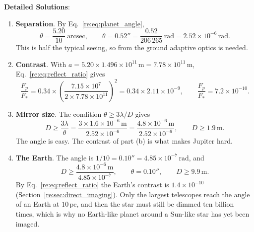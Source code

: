 \textbf{Detailed Solutions}:
\begin{enumerate}[label=(\alph*)]
	\item \textbf{Separation}. By Eq.~\eqref{re:eq:planet_angle},
	\[
	\theta=\frac{5.20}{10}\ \text{arcsec},\qquad
	\boxed{\theta=0.52''=\frac{0.52}{206\,265}\,\mathrm{rad}=2.52\times10^{-6}\,\mathrm{rad}.}
	\]
	This is half the typical seeing, so from the ground adaptive optics is needed.

	\item \textbf{Contrast}. With $a=5.20\times1.496\times10^{11}\,\mathrm m=7.78\times10^{11}\,\mathrm m$, Eq.~\eqref{re:eq:reflect_ratio} gives
	\[
	\frac{F_p}{F_*}=0.34\times\left(\frac{7.15\times10^7}{2\times7.78\times10^{11}}\right)^2=0.34\times2.11\times10^{-9},
	\qquad
	\boxed{\frac{F_p}{F_*}=7.2\times10^{-10}.}
	\]

	\item \textbf{Mirror size}. The condition $\theta\ge3\lambda/D$ gives
	\[
	D\ge\frac{3\lambda}{\theta}=\frac{3\times1.6\times10^{-6}\,\mathrm m}{2.52\times10^{-6}}=\frac{4.8\times10^{-6}\,\mathrm m}{2.52\times10^{-6}},
	\qquad
	\boxed{D\ge1.9\,\mathrm m.}
	\]
	The angle is easy. The contrast of part (b) is what makes Jupiter hard.

	\item \textbf{The Earth}. The angle is $1/10=0.10''=4.85\times10^{-7}\,\mathrm{rad}$, and
	\[
	D\ge\frac{4.8\times10^{-6}\,\mathrm m}{4.85\times10^{-7}},
	\qquad
	\boxed{\theta=0.10'',\qquad D\ge9.9\,\mathrm m.}
	\]
	By Eq.~\eqref{re:eq:reflect_ratio} the Earth's contrast is $1.4\times10^{-10}$ (Section~\ref{re:sec:direct_imaging}). Only the largest telescopes reach the angle of an Earth at $10\,\mathrm{pc}$, and then the star must still be dimmed ten billion times, which is why no Earth-like planet around a Sun-like star has yet been imaged.
\end{enumerate}
